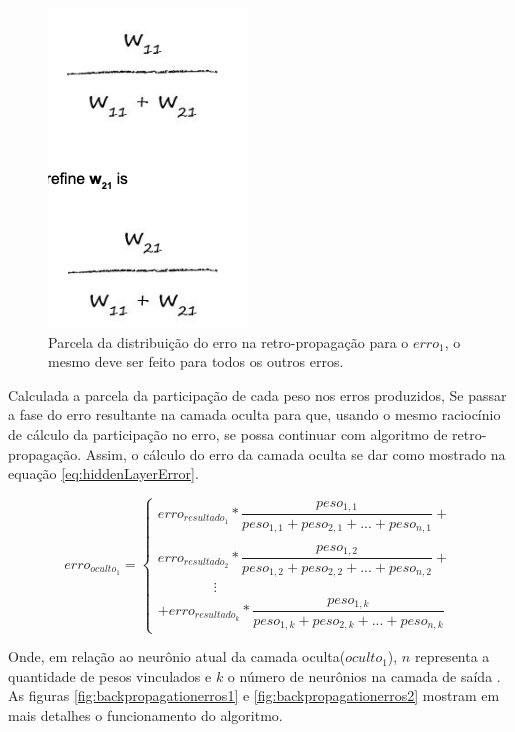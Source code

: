 \begin{apendicesenv}
		\begin{figure}[H]
			\centering
			\caption{Parcela da distribuição do erro na retro-propagação para o $erro_1$, o mesmo deve ser feito para todos os outros erros.}
			\label{fig:backpropagationErrors}
			\includegraphics[width=0.4\linewidth]{images/TEMPbackpropagationErros}
		\end{figure}
		
		\par Calculada a parcela da participação de cada peso nos erros produzidos, Se passar a fase do erro resultante na camada oculta para que, usando o mesmo raciocínio de cálculo da participação no erro, se possa continuar com algoritmo de retro-propagação. Assim, o cálculo do erro da camada oculta se dar como mostrado na equação \ref{eq:hiddenLayerError}.
		
		\begin{equation}
			\label{eq:hiddenLayerError}
			erro_{oculto_1} = \begin{cases} 
				erro_{resultado_1}  * \dfrac{peso_{1,1}}{peso_{1,1} + peso_{2,1}+ ... + peso_{n,1}}  + \\\\
				erro_{resultado_2}  * \dfrac{peso_{1,2}}{peso_{1,2} + peso_{2,2}+ ... + peso_{n,2}}  + \\
				\qquad\qquad \vdots \\
				+ erro_{resultado_k}  * \dfrac{peso_{1,k}}{peso_{1,k} + peso_{2,k}+ ... + peso_{n,k}} 
			\end{cases}			 
		\end{equation}
	
		\par Onde, em relação ao neurônio atual da camada oculta($oculto_1$), $n$ representa a quantidade de pesos vinculados e $k$ o número de neurônios na camada de saída . As figuras \ref{fig:backpropagationerros1} e \ref{fig:backpropagationerros2} mostram em mais detalhes o funcionamento do algoritmo.
		

\end{apendicesenv}
